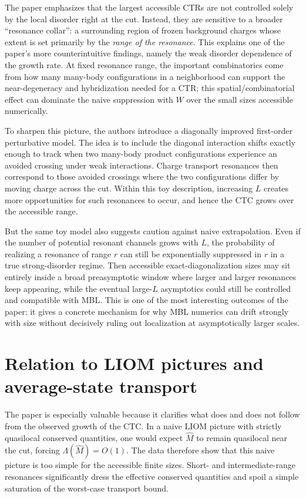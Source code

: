 \documentclass[11pt]{article}
\begin{document}
The paper emphasizes that the largest accessible CTRs are not controlled solely by the local disorder right at the cut. Instead, they are sensitive to a broader ``resonance collar'': a surrounding region of frozen background charges whose extent is set primarily by the \emph{range of the resonance}. This explains one of the paper's more counterintuitive findings, namely the weak disorder dependence of the growth rate. At fixed resonance range, the important combinatorics come from how many many-body configurations in a neighborhood can support the near-degeneracy and hybridization needed for a CTR; this spatial/combinatorial effect can dominate the naive suppression with $W$ over the small sizes accessible numerically.

To sharpen this picture, the authors introduce a diagonally improved first-order perturbative model. The idea is to include the diagonal interaction shifts exactly enough to track when two many-body product configurations experience an avoided crossing under weak interactions. Charge transport resonances then correspond to those avoided crossings where the two configurations differ by moving charge across the cut. Within this toy description, increasing $L$ creates more opportunities for such resonances to occur, and hence the CTC grows over the accessible range.

But the same toy model also suggests caution against naive extrapolation. Even if the number of potential resonant channels grows with $L$, the probability of realizing a resonance of range $r$ can still be exponentially suppressed in $r$ in a true strong-disorder regime. Then accessible exact-diagonalization sizes may sit entirely inside a broad preasymptotic window where larger and larger resonances keep appearing, while the eventual large-$L$ asymptotics could still be controlled and compatible with MBL. This is one of the most interesting outcomes of the paper: it gives a concrete mechanism for why MBL numerics can drift strongly with size without decisively ruling out localization at asymptotically larger scales.

\section*{Relation to LIOM pictures and average-state transport}
The paper is especially valuable because it clarifies what does and does not follow from the observed growth of the CTC. In a naive LIOM picture with strictly quasilocal conserved quantities, one would expect $\hat M$ to remain quasilocal near the cut, forcing $\Lambda(\hat M)=O(1)$. The data therefore show that this naive picture is too simple for the accessible finite sizes. Short- and intermediate-range resonances significantly dress the effective conserved quantities and spoil a simple saturation of the worst-case transport bound.
\end{document}
